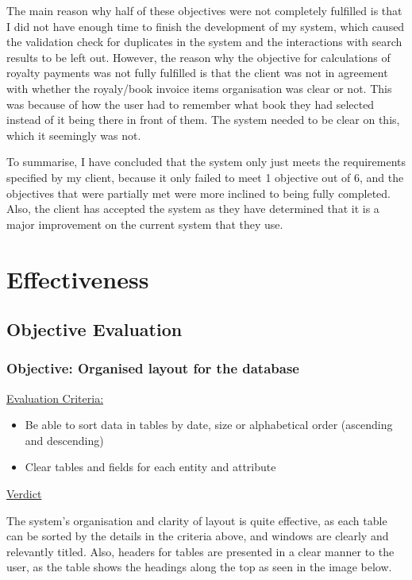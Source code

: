 The main reason why half of these objectives were not completely fulfilled is that I did not have enough time to finish the development of my system, which caused the validation check for duplicates in the system and the interactions with search results to be left out. However, the reason why the objective for calculations of royalty payments was not fully fulfilled is that the client was not in agreement with whether the royaly/book invoice items organisation was clear or not. This was because of how the user had to remember what book they had selected instead of it being there in front of them. The system needed to be clear on this, which it seemingly was not.

To summarise, I have concluded that the system only just meets the requirements specified by my client, because it only failed to meet 1 objective out of 6, and the objectives that were partially met were more inclined to being fully completed. Also, the client has accepted the system as they have determined that it is a major improvement on the current system that they use.

\section{Effectiveness}

\subsection{Objective Evaluation}

\subsubsection{Objective: Organised layout for the database}

\underline{Evaluation Criteria:}

\begin{itemize}
    \item Be able to sort data in tables by date, size or alphabetical order (ascending and descending)
    \item Clear tables and fields for each entity and attribute
\end{itemize}


\underline{Verdict}

The system's organisation and clarity of layout is quite effective, as each table can be sorted by the details in the criteria above, and windows are clearly and relevantly titled. Also, headers for tables are presented in a clear manner to the user, as the table shows the headings along the top as seen in the image below.

